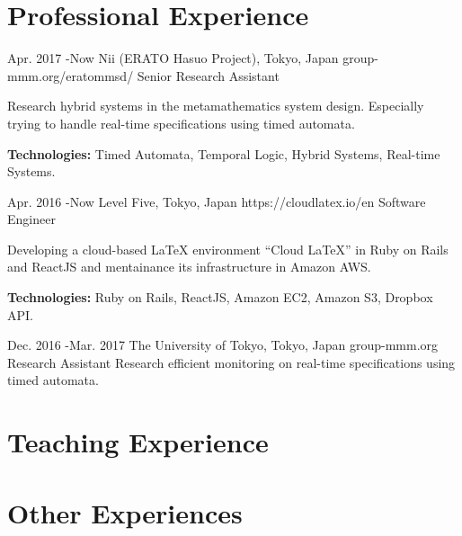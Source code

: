 \documentclass[10pt]{article} %
\begin{document}
\section{Professional Experience}

\job
{Apr. 2017 -}{Now}
{Nii (ERATO Hasuo Project), Tokyo, Japan}
{group-mmm.org/eratommsd/}
{Senior Research Assistant}
{Research hybrid systems in the metamathematics system design. Especially trying to handle real-time specifications using timed automata.\\
\rule{0mm}{5mm}\textbf{Technologies:} Timed Automata, Temporal Logic, Hybrid Systems, Real-time Systems.}

\job
{Apr. 2016 -}{Now}
{Level Five, Tokyo, Japan}
{https://cloudlatex.io/en}
{Software Engineer}
{Developing a cloud-based LaTeX environment ``Cloud LaTeX'' in Ruby on Rails and ReactJS and mentainance its infrastructure in Amazon AWS.\\
\rule{0mm}{5mm}\textbf{Technologies:} Ruby on Rails, ReactJS, Amazon EC2, Amazon S3, Dropbox API.}

\job
{Dec. 2016 -}{Mar. 2017}
{The University of Tokyo, Tokyo, Japan}
{group-mmm.org}
{Research Assistant}
{Research efficient monitoring on real-time specifications using timed automata.}

\section{Teaching Experience}



\section{Other Experiences}
\end{document}
